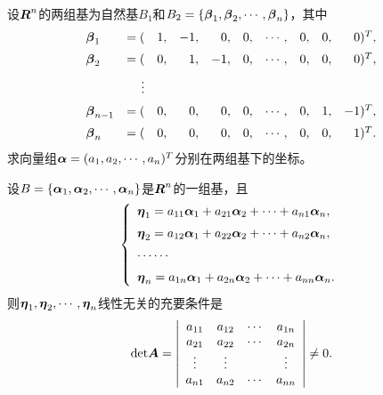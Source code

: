 \begin{frame}
  
    \begin{li}
      设$\boldsymbol{R}^n$的两组基为自然基$B_1$和$B_2=\{\boldsymbol{\beta}_1,\boldsymbol{\beta}_2,\cdots,\boldsymbol{\beta}_n\}$，其中
      \begin{equation}\label{twobase}
      \begin{array}{lrrrrrrrrr}
        \boldsymbol{\beta}_1&=(&1,&-1,& 0,&0,&\cdots,&0,&0,&0)^T,\\[0.2cm]
        \boldsymbol{\beta}_2&=(&0,& 1,&-1,&0,&\cdots,&0,&0,&0)^T,\\[0.2cm]
        &\vdots&&&&&\\[0.2cm]
        \boldsymbol{\beta}_{n-1}&=(&0,&0,&0,&0,&\cdots,&0,&1,&-1)^T,\\[0.2cm]
        \boldsymbol{\beta}_{n}&=(&0,&0,&0,&0,&\cdots,&0,&0,&1)^T.
      \end{array}
      \end{equation}
      求向量组$\boldsymbol{\alpha}=(a_1,a_2,\cdots,a_n)^T$分别在两组基下的坐标。
    \end{li}
  
\end{frame}


\begin{frame}
  
    \begin{dingli}
      设$B=\{\boldsymbol{\alpha}_1,\boldsymbol{\alpha}_2,\cdots,\boldsymbol{\alpha}_n\}$是$\boldsymbol{R}^n$的一组基，且
      $$
      \left\{
      \begin{array}{l}
        \boldsymbol{\eta}_1=a_{11}\boldsymbol{\alpha}_1+a_{21}\boldsymbol{\alpha}_2+\cdots+a_{n1}\boldsymbol{\alpha}_n,\\[0.2cm]
        \boldsymbol{\eta}_2=a_{12}\boldsymbol{\alpha}_1+a_{22}\boldsymbol{\alpha}_2+\cdots+a_{n2}\boldsymbol{\alpha}_n,\\[0.2cm]
        \cdots\cdots\\[0.2cm]
        \boldsymbol{\eta}_n=a_{1n}\boldsymbol{\alpha}_1+a_{2n}\boldsymbol{\alpha}_2+\cdots+a_{nn}\boldsymbol{\alpha}_n.
      \end{array}
      \right.
      $$
      则$\boldsymbol{\eta}_1,\boldsymbol{\eta}_2,\cdots,\boldsymbol{\eta}_n$线性无关的充要条件是
      $$
      \mathrm{det}\boldsymbol{A}=\left|
      \begin{array}{cccc}
        a_{11}&a_{12}&\cdots&a_{1n}\\
        a_{21}&a_{22}&\cdots&a_{2n}\\
        \vdots&\vdots&&\vdots\\
        a_{n1}&a_{n2}&\cdots&a_{nn}
      \end{array}
      \right|\ne 0.
      $$
    \end{dingli}
  
\end{frame}


